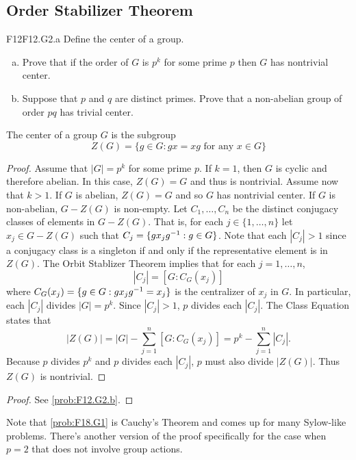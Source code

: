 \documentclass[../AlgebraQualSolutions.tex]{subfiles}
\begin{document}
\subsection{Order Stabilizer Theorem}


\begin{prob}{F12}{F12.G2.a}
Define the center of a group.
\begin{enumerate}[(a)]
\item Prove that if the order of $G$ is $p^k$ for some prime $p$ then $G$ has nontrivial center.
\item Suppose that $p$ and $q$ are distinct primes. Prove that a non-abelian group of order $pq$ has trivial center.
\end{enumerate}
\end{prob}

The center of a group $G$ is the subgroup
	\[Z(G) = \{g \in G: gx = xg \textrm{ for any $x \in G$} \} \]

\begin{proof}
Assume that $|G| = p^k$ for some prime $p$. If $k = 1$, then $G$ is cyclic and therefore abelian. In this case, $Z(G) = G$ and thus is nontrivial. Assume now that $k > 1$. If $G$ is abelian, $Z(G) = G$ and so $G$ has nontrivial center. If $G$ is non-abelian, $G - Z(G)$ is non-empty. Let $C_1, \ldots, C_n$ be the distinct conjugacy classes of elements in $G - Z(G)$. That is, for each $j \in \{1, \ldots, n\}$ let $x_j \in G - Z(G)$ such that $C_j = \{gx_jg^{-1}: g \in G\}$. Note that each $|C_j| > 1$ since a conjugacy class is a singleton if and only if the representative element is in $Z(G)$. The Orbit Stablizer Theorem implies that for each $j = 1, \ldots, n$,
	\[ |C_j| =  [G: C_G(x_j)] \]
where $C_G(x_j) = \{g \in G: gx_jg^{-1} = x_j \}$ is the centralizer of $x_j$ in $G$. In particular, each $|C_j|$ divides $|G| = p^k$. Since $|C_j| > 1$, $p$ divides each $|C_j|$. The Class Equation states that 
	\[|Z(G)| = |G| - \sum_{j=1}^n [G: C_G(x_j)] = p^k -  \sum_{j=1}^n |C_j| .\]
Because $p$ divides $p^k$ and $p$ divides each $|C_j|$, $p$ must also divide $|Z(G)|$. Thus $Z(G)$ is nontrivial.
\end{proof}

\begin{proof}
	See \ref{prob:F12.G2.b}.
\end{proof}

Note that \ref{prob:F18.G1} is Cauchy's Theorem and comes up for many Sylow-like problems. There's another version of the proof specifically for the case when $p = 2$ that does not involve group actions.
\end{document}
